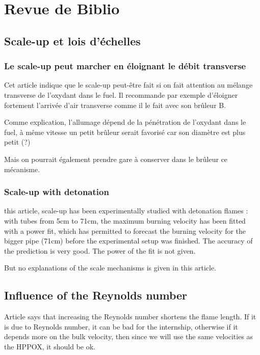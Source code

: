 \chapter[Revue de Biblio]%
{Revue de Biblio}
\label{revue_de_biblio}
\section{Scale-up et lois d'échelles}

\subsection{Le scale-up peut marcher en éloignant le débit transverse}
\cite{shigeru_azuhata_scale-up_study_of_gas_composition.pdf_1986}
Cet article indique que le scale-up peut-être fait si on fait attention au mélange transverse de l'oxydant dans le fuel. Il recommande par exemple d'éloigner fortement l'arrivée d'air transverse comme il le fait avec son brûleur B. 

Comme explication, l'allumage dépend de la pénétration de l'oxydant dans le fuel, à même vitesse un petit brûleur serait favorisé car son diamètre est plus petit (?)

Mais on pourrait également prendre gare à conserver dans le brûleur ce mécanisme.

\subsection{Scale-up with detonation}

\cite{fig_experimental_2016} this article, scale-up has been experimentally studied with detonation flames : with tubes from 5cm to 71cm, the maximum burning velocity has been fitted with a power fit, which has permitted to forecast the burning velocity for the bigger pipe (71cm) before the experimental setup was finished. The accuracy of the prediction is very good. The power of the fit is not given.

But no explanations of the scale mechanisms is given in this article.
\section{Influence of the Reynolds number}

Article \cite{milosavljevic_influence_1990}  says that increasing the Reynolds number shortens the flame length. If it is due to Reynolds number, it can be bad for the internship, otherwise if it depends more on the bulk velocity, then since we will use the same velocities as the HPPOX, it should be ok.

